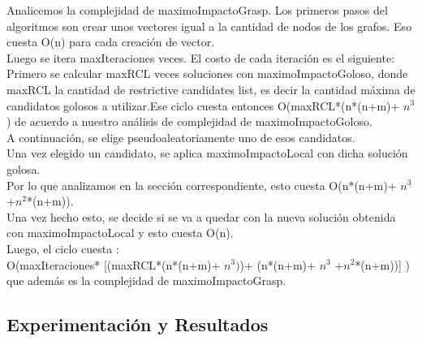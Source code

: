\indent Analicemos la complejidad de maximoImpactoGrasp. Los primeros pasos del algoritmos son crear unos vectores igual a la cantidad de nodos de los grafos. Eso cuesta O(n) para cada creación de vector.\\
\indent Luego se itera maxIteraciones veces. El costo de cada iteración es el siguiente:\\
\indent Primero se calcular maxRCL veces soluciones con maximoImpactoGoloso, donde maxRCL la cantidad de restrictive candidates list, es decir la cantidad máxima de candidatos golosos a utilizar.Ese ciclo cuesta entonces O(maxRCL*(n*(n+m)+ $n^{3}$) de acuerdo a nuestro análisis de complejidad de maximoImpactoGoloso.\\
\indent A continuación, se elige pseudoaleatoriamente uno de esos candidatos.\\
\indent Una vez elegido un candidato, se aplica maximoImpactoLocal con dicha solución golosa.\\ Por lo que analizamos en la sección correspondiente, esto cuesta O(n*(n+m)+ $n^{3}$ +$ n^{2}$*(n+m)).\\
\indent Una vez hecho esto, se decide si se va a quedar con la nueva solución obtenida con maximoImpactoLocal y esto cuesta O(n).\\
\indent Luego, el ciclo cuesta :\\

O(maxIteraciones* [(maxRCL*(n*(n+m)+ $n^{3})$)+ (n*(n+m)+ $n^{3}$ +$ n^{2}$*(n+m))] )\\

 que además es la complejidad de maximoImpactoGrasp.\\


\subsection{Experimentación y Resultados}
